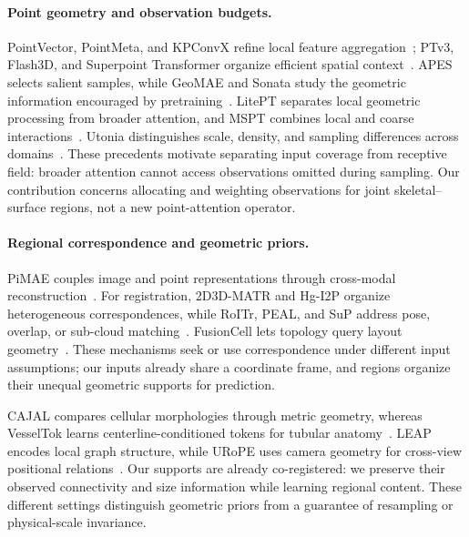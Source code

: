 \paragraph{Point geometry and observation budgets.}
PointVector, PointMeta, and KPConvX refine local feature aggregation~\cite{pointvector2023,pointmeta2023,kpconvx2024}; PTv3, Flash3D, and Superpoint Transformer organize efficient spatial context~\cite{ptv32024,flash3d2025,spt2023}. APES selects salient samples, while GeoMAE and Sonata study the geometric information encouraged by pretraining~\cite{apes2023,geomae2023,sonata2025}. LitePT separates local geometric processing from broader attention, and MSPT combines local and coarse interactions~\cite{litept2026,mspt2026}. Utonia distinguishes scale, density, and sampling differences across domains~\cite{utonia2026}. These precedents motivate separating input coverage from receptive field: broader attention cannot access observations omitted during sampling. Our contribution concerns allocating and weighting observations for joint skeletal--surface regions, not a new point-attention operator.

\paragraph{Regional correspondence and geometric priors.}
PiMAE couples image and point representations through cross-modal reconstruction~\cite{pimae2023}. For registration, 2D3D-MATR and Hg-I2P organize heterogeneous correspondences, while RoITr, PEAL, and SuP address pose, overlap, or sub-cloud matching~\cite{matr2023,hgi2p2026,roitr2023,peal2023,sup2026}. FusionCell lets topology query layout geometry~\cite{fusioncell2026}. These mechanisms seek or use correspondence under different input assumptions; our inputs already share a coordinate frame, and regions organize their unequal geometric supports for prediction.

CAJAL compares cellular morphologies through metric geometry, whereas VesselTok learns centerline-conditioned tokens for tubular anatomy~\cite{govek2023cajal,vesseltok2026}. LEAP encodes local graph structure, while URoPE uses camera geometry for cross-view positional relations~\cite{leap2026,urope2026}. Our supports are already co-registered: we preserve their observed connectivity and size information while learning regional content. These different settings distinguish geometric priors from a guarantee of resampling or physical-scale invariance.
